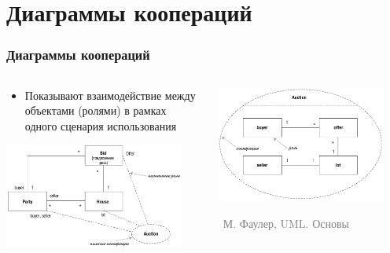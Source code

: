\documentclass[xetex,mathserif,serif]{beamer}
\newcommand{\attribution}[1] {
    \vspace{-5mm}\begin{flushright}\begin{scriptsize}\textcolor{gray}{\textcopyright\, #1}\end{scriptsize}\end{flushright}
}
\begin{document}
    \section{Диаграммы коопераций}

    \begin{frame}
        \frametitle{Диаграммы коопераций}
        \begin{columns}
            \begin{column}{0.5\textwidth}
                \begin{itemize}
                    \item Показывают взаимодействие между объектами (ролями) в рамках одного сценария использования
                \end{itemize}
                \vspace{3mm}
                \begin{center}
                    \includegraphics[width=0.9\textwidth]{cooperationAlternateNotation.png}
                \end{center}
            \end{column}
            \begin{column}{0.5\textwidth}
                \begin{center}
                    \includegraphics[width=0.9\textwidth]{cooperationDiagram.png}
                    \attribution{М. Фаулер, UML. Основы}
                \end{center}
            \end{column}
        \end{columns}
    \end{frame}
\end{document}
